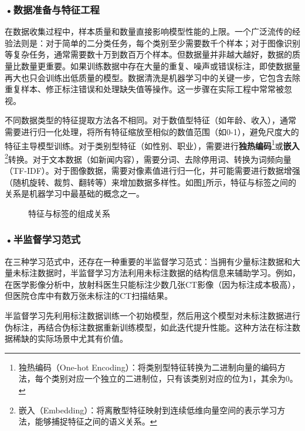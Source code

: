 \subsubsection*{\textbf{•数据准备与特征工程}}

在数据收集过程中，样本质量和数量直接影响模型性能的上限。一个广泛流传的经验法则是：对于简单的二分类任务，每个类别至少需要数千个样本；对于图像识别等复杂任务，通常需要数十万到数百万个样本。但数据量并非越大越好，数据的质量比数量更重要。如果训练数据中存在大量的重复、噪声或错误标注，即使数据量再大也只会训练出低质量的模型。数据清洗是机器学习中的关键一步，它包含去除重复样本、修正标注错误和处理缺失值等操作。这一步骤在实际工程中常常被忽视。

不同数据类型的特征提取方法各不相同。对于数值型特征（如年龄、收入），通常需要进行归一化处理，将所有特征缩放至相似的数值范围（如0-1），避免尺度大的特征主导模型训练。对于类别型特征（如性别、职业），需要进行\textbf{独热编码}\footnote{独热编码（One-hot Encoding）：将类别型特征转换为二进制向量的编码方法，每个类别对应一个独立的二进制位，只有该类别对应的位为1，其余为0。}或\textbf{嵌入}\footnote{嵌入（Embedding）：将离散型特征映射到连续低维向量空间的表示学习方法，能够捕捉特征之间的语义关系。}转换。对于文本数据（如新闻内容），需要分词、去除停用词、转换为词频向量（TF-IDF）。对于图像数据，需要对像素值进行归一化，并可能需要进行数据增强（随机旋转、裁剪、翻转等）来增加数据多样性。如图\ref{fig:ch2_2_1}所示，特征与标签之间的关系是机器学习中最基础的概念之一。

\begin{figure}[H]
\centering
{}
\caption{特征与标签的组成关系}
\label{fig:ch2_2_1}
\end{figure}

\subsubsection*{\textbf{•半监督学习范式}}

在三种学习范式中，还存在一种重要的半监督学习范式：当拥有少量标注数据和大量未标注数据时，半监督学习方法利用未标注数据的结构信息来辅助学习。例如，在医学影像分析中，放射科医生只能标注少数几张CT影像（因为标注成本极高），但医院仓库中有数万张未标注的CT扫描结果。

半监督学习先利用标注数据训练一个初始模型，然后用这个模型对未标注数据进行伪标注，再结合伪标注数据重新训练模型，如此迭代提升性能。这种方法在标注数据稀缺的实际场景中尤其有价值。






